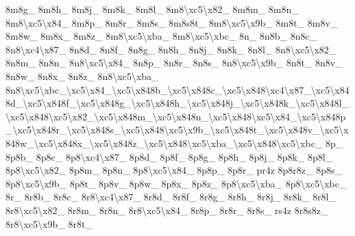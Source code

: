 \begin{DoxyCompactItemize}
8m8g\-\_\- 8m8h\-\_\- 8m8j\-\_\- 8m8k\-\_\- 8m8l\-\_\- 8m8\textbackslash{}xc5\textbackslash{}x82\-\_\- 8m8m\-\_\- 8m8n\-\_\- 8m8\textbackslash{}xc5\textbackslash{}x84\-\_\- 8m8p\-\_\- 8m8r\-\_\- 8m8s\-\_\- 8m8s8t\-\_\- 8m8\textbackslash{}xc5\textbackslash{}x9b\-\_\- 8m8t\-\_\- 8m8v\-\_\- 8m8w\-\_\- 8m8x\-\_\- 8m8z\-\_\- 8m8\textbackslash{}xc5\textbackslash{}xba\-\_\- 8m8\textbackslash{}xc5\textbackslash{}xbc\-\_\- 8n\-\_\- 8n8b\-\_\- 8n8c\-\_\- 8n8\textbackslash{}xc4\textbackslash{}x87\-\_\- 8n8d\-\_\- 8n8f\-\_\- 8n8g\-\_\- 8n8h\-\_\- 8n8j\-\_\- 8n8k\-\_\- 8n8l\-\_\- 8n8\textbackslash{}xc5\textbackslash{}x82\-\_\- 8n8m\-\_\- 8n8n\-\_\- 8n8\textbackslash{}xc5\textbackslash{}x84\-\_\- 8n8p\-\_\- 8n8r\-\_\- 8n8s\-\_\- 8n8\textbackslash{}xc5\textbackslash{}x9b\-\_\- 8n8t\-\_\- 8n8v\-\_\- 8n8w\-\_\- 8n8x\-\_\- 8n8z\-\_\- 8n8\textbackslash{}xc5\textbackslash{}xba\-\_\- 8n8\textbackslash{}xc5\textbackslash{}xbc\-\_\textbackslash{}xc5\textbackslash{}x84\-\_\textbackslash{}xc5\textbackslash{}x848b\-\_\textbackslash{}xc5\textbackslash{}x848c\-\_\textbackslash{}xc5\textbackslash{}x848\textbackslash{}xc4\textbackslash{}x87\-\_\textbackslash{}xc5\textbackslash{}x848d\-\_\textbackslash{}xc5\textbackslash{}x848f\-\_\textbackslash{}xc5\textbackslash{}x848g\-\_\textbackslash{}xc5\textbackslash{}x848h\-\_\textbackslash{}xc5\textbackslash{}x848j\-\_\textbackslash{}xc5\textbackslash{}x848k\-\_\textbackslash{}xc5\textbackslash{}x848l\-\_\textbackslash{}xc5\textbackslash{}x848\textbackslash{}xc5\textbackslash{}x82\-\_\textbackslash{}xc5\textbackslash{}x848m\-\_\textbackslash{}xc5\textbackslash{}x848n\-\_\textbackslash{}xc5\textbackslash{}x848\textbackslash{}xc5\textbackslash{}x84\-\_\textbackslash{}xc5\textbackslash{}x848p\-\_\textbackslash{}xc5\textbackslash{}x848r\-\_\textbackslash{}xc5\textbackslash{}x848s\-\_\textbackslash{}xc5\textbackslash{}x848\textbackslash{}xc5\textbackslash{}x9b\-\_\textbackslash{}xc5\textbackslash{}x848t\-\_\textbackslash{}xc5\textbackslash{}x848v\-\_\textbackslash{}xc5\textbackslash{}x848w\-\_\textbackslash{}xc5\textbackslash{}x848x\-\_\textbackslash{}xc5\textbackslash{}x848z\-\_\textbackslash{}xc5\textbackslash{}x848\textbackslash{}xc5\textbackslash{}xba\-\_\textbackslash{}xc5\textbackslash{}x848\textbackslash{}xc5\textbackslash{}xbc\-\_\- 8p\-\_\- 8p8b\-\_\- 8p8c\-\_\- 8p8\textbackslash{}xc4\textbackslash{}x87\-\_\- 8p8d\-\_\- 8p8f\-\_\- 8p8g\-\_\- 8p8h\-\_\- 8p8j\-\_\- 8p8k\-\_\- 8p8l\-\_\- 8p8\textbackslash{}xc5\textbackslash{}x82\-\_\- 8p8m\-\_\- 8p8n\-\_\- 8p8\textbackslash{}xc5\textbackslash{}x84\-\_\- 8p8p\-\_\- 8p8r\-\_\- pr4z 8p8r8z\-\_\- 8p8s\-\_\- 8p8\textbackslash{}xc5\textbackslash{}x9b\-\_\- 8p8t\-\_\- 8p8v\-\_\- 8p8w\-\_\- 8p8x\-\_\- 8p8z\-\_\- 8p8\textbackslash{}xc5\textbackslash{}xba\-\_\- 8p8\textbackslash{}xc5\textbackslash{}xbc\-\_\- 8r\-\_\- 8r8b\-\_\- 8r8c\-\_\- 8r8\textbackslash{}xc4\textbackslash{}x87\-\_\- 8r8d\-\_\- 8r8f\-\_\- 8r8g\-\_\- 8r8h\-\_\- 8r8j\-\_\- 8r8k\-\_\- 8r8l\-\_\- 8r8\textbackslash{}xc5\textbackslash{}x82\-\_\- 8r8m\-\_\- 8r8n\-\_\- 8r8\textbackslash{}xc5\textbackslash{}x84\-\_\- 8r8p\-\_\- 8r8r\-\_\- 8r8s\-\_\- rs4z 8r8s8z\-\_\- 8r8\textbackslash{}xc5\textbackslash{}x9b\-\_\- 8r8t\-\_\- 
\end{DoxyCompactItemize}
